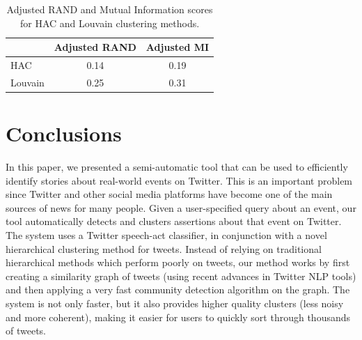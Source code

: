 \documentclass[letterpaper]{article}
\begin{document}
\begin{table}[!htbp]
\centering
\small
\begin{adjustbox}{width=0.56\columnwidth}
\begin{tabular}{@{}l|c|c@{}}
& Adjusted RAND & Adjusted MI \\
\hline
HAC & 0.14 & 0.19  \\
\hline
Louvain & 0.25 & 0.31    \\
\end{tabular}
\end{adjustbox}
\caption{Adjusted RAND and Mutual Information scores for HAC and Louvain clustering methods.}

\label{tab:rand}
\end{table}


\section{Conclusions}

In this paper, we presented a semi-automatic tool that can be used to efficiently identify stories about real-world events on Twitter. This is an important problem since Twitter and other social media platforms have become one of the main sources of news for many people. %
Given a user-specified query about an event, our tool automatically detects and clusters assertions about that event on Twitter. The system uses a Twitter speech-act classifier, in conjunction with a novel hierarchical clustering method for tweets. Instead of relying on traditional hierarchical methods which perform  poorly on tweets, our method works by first creating a similarity graph of tweets (using recent advances in Twitter NLP tools) and then applying a very fast community detection algorithm on the graph. The system is not only faster, but it also provides higher quality clusters (less noisy and more coherent), making it easier for users to quickly sort through thousands of tweets.
\end{document}
